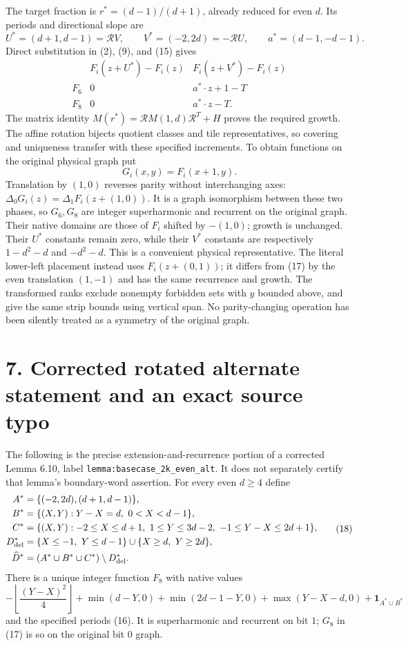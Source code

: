 \documentclass[11pt]{article}
\newcommand{\ind}{\mathbf1}
\begin{document}
The target fraction is $r^*=(d-1)/(d+1)$, already reduced for even $d$.
Its periods and directional slope are
\[
 U^*=(d+1,d-1)=\mathcal R V,\qquad
 V^*=(-2,2d)=-\mathcal R U,\qquad a^*=(d-1,-d-1).
\]
Direct substitution in (2), (9), and (15) gives
\[
\begin{array}{c|cc}
&F_i(z+U^*)-F_i(z)&F_i(z+V^*)-F_i(z)\\\hline
F_6&0&a^*\!\cdot z+1-T\\
F_8&0&a^*\!\cdot z-T.
\end{array}                                                   \tag{16}
\]
The matrix identity
$M(r^*)=\mathcal R M(1,d)\mathcal R^T+H$ proves the required growth.
The affine rotation bijects quotient classes and tile representatives,
so covering and uniqueness transfer with these specified increments.
To obtain functions on the original physical graph put
\[
 G_i(x,y)=F_i(x+1,y).                                       \tag{17}
\]
Translation by $(1,0)$ reverses parity without interchanging axes:
$\Delta_0G_i(z)=\Delta_1F_i(z+(1,0))$. It is a graph isomorphism
between these two phases, so $G_6,G_8$ are integer superharmonic and
recurrent on the original graph. Their native domains are those of
$F_i$ shifted by $-(1,0)$; growth is unchanged. Their $U^*$ constants
remain zero, while their $V^*$ constants are respectively
$1-d^2-d$ and $-d^2-d$. This is a convenient physical representative. The literal lower-left
placement instead uses $F_i(z+(0,1))$; it differs from (17) by the
even translation $(1,-1)$ and has the same recurrence and growth.
The transformed ranks exclude nonempty forbidden
sets with $y$ bounded above, and give the same strip bounds using
vertical span. No parity-changing operation has been silently treated
as a symmetry of the original graph.

\section*{7. Corrected rotated alternate statement and an exact source typo}
The following is the precise extension-and-recurrence portion of a
corrected Lemma 6.10, label \texttt{lemma:basecase\_2k\_even\_alt}.
It does not separately certify that lemma's boundary-word assertion.
For every even $d\ge4$ define
\[
\begin{split}
 A^*&=\{(-2,2d),(d+1,d-1)\},\\
 B^*&=\{(X,Y):Y-X=d,\ 0<X<d-1\},\\
 C^*&=\{(X,Y):-2\le X\le d+1,\ 1\le Y\le3d-2,
                         \ -1\le Y-X\le2d+1\},\\
 D^*_{\rm del}&=\{X\le-1,\ Y\le d-1\}
                  \cup\{X\ge d,\ Y\ge2d\},\\
 \widehat D^*&=(A^*\cup B^*\cup C^*)\setminus D^*_{\rm del}.
\end{split}                                                   \tag{18}
\]
There is a unique integer function $F_8$ with native values
\[
 -\left\lfloor\frac{(Y-X)^2}{4}\right\rfloor
 +\min(d-Y,0)+\min(2d-1-Y,0)+\max(Y-X-d,0)
 +\ind_{A^*\cup B^*}                                       \tag{19}
\]
and the specified periods (16). It is superharmonic and recurrent on
bit $1$; $G_8$ in (17) is so on the original bit $0$ graph.
\end{document}
